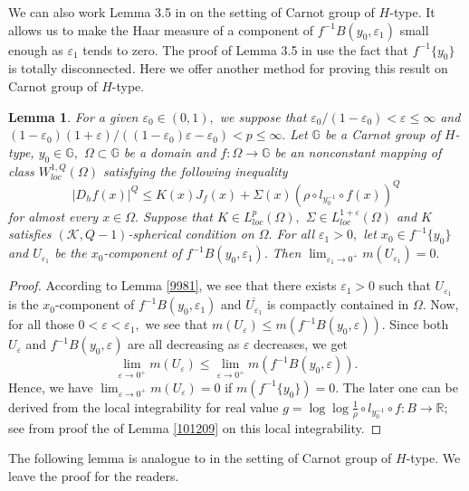 \documentclass[11pt,twoside]{article}
\newtheorem{lem}[thm]{Lemma}
\theoremstyle{definition}
\theoremstyle{remark}
\begin{document}
We can also work  Lemma 3.5  in  \cite{KO221}  on the setting of  Carnot group of $H$-type. It allows us to make the Haar measure of a component of $f^{-1}B(y_{0},\varepsilon_{1})$ small enough as $\varepsilon_{1}$ tends to zero. The proof of Lemma 3.5  in  \cite{KO221}  use the fact that  $f^{-1}\{y_{0}\}$ is totally disconnected. Here we offer another method for proving this result on Carnot group of $H$-type.
\begin{lem}
 For a given $\varepsilon_{0}\in(0,1),$ we suppose that $\varepsilon_{0}/(1-\varepsilon_{0})<\varepsilon\leq\infty$ and $(1-\varepsilon_{0})(1+\varepsilon)/((1-\varepsilon_{0})\varepsilon-\varepsilon_{0})<p\leq\infty.$ Let $\mathbb{G}$ be a Carnot group of $H$-type,  $y_{0}\in\mathbb{G},$ $\Omega\subset\mathbb{G}$ be a domain and $f:\Omega\rightarrow \mathbb{G}$ be an nonconstant mapping of class $W_{loc}^{1,Q}(\Omega)$ satisfying  the following inequality
$$\vert D_{h}f(x)\vert^{Q}\leq K(x)J_{f}(x)+\Sigma(x)(\rho\circ l_{y_{0}^{-1}}\circ f(x))^{Q}$$
for almost every $x\in\Omega.$ Suppose that $K\in L_{loc}^{p}(\Omega),$  $\Sigma\in L_{loc}^{1+\varepsilon}(\Omega)$  and $K$ satisfies $(\mathcal{K},Q-1)$-spherical  condition on $\Omega.$ For all $\varepsilon_{1}>0,$ let $x_{0}\in f^{-1}\{y_{0}\}$ and $U_{\varepsilon_{1}}$ be the $x_{0}$-component of $f^{-1}B(y_{0},\varepsilon_{1}).$ Then
$\lim_{\varepsilon_{1}\rightarrow0^{+}}m(U_{\varepsilon_{1}})=0.$
\end{lem}
\begin{proof}
According to Lemma \ref{9981}, we see that there exists $\varepsilon_{1}>0$ such that  $U_{\varepsilon_{1}}$ is the $x_{0}$-component of $f^{-1}B(y_{0},\varepsilon_{1})$ and $\overline{U_{\varepsilon_{1}}}$ is compactly contained in $\Omega.$ Now, for all those $0<\varepsilon<\varepsilon_{1},$ we see that $m(U_{\varepsilon})\leq m(f^{-1}B(y_{0},\varepsilon)).$ Since both $U_{\varepsilon}$ and $f^{-1}B(y_{0},\varepsilon)$ are all decreasing as $\varepsilon$ decreases, we get 
$$\lim_{\varepsilon\rightarrow0^{+}}m(U_{\varepsilon})\leq \lim_{\varepsilon\rightarrow0^{+}}m(f^{-1}B(y_{0},\varepsilon)).$$
Hence, we have $\lim_{\varepsilon\rightarrow0^{+}}m(U_{\varepsilon})=0$ if $m(f^{-1}\{y_{0}\})=0.$ The later one can be derived from the local integrability for real value $g=\log\log\frac{1}{\rho}\circ l_{y_{0}^{-1}}\circ f: B\rightarrow \mathbb{R};$ see from proof the of Lemma \ref{101209} on this local integrability.
\end{proof}
The following lemma is analogue to \cite[Lemma 4.1]{KO221} in the setting of Carnot group of $H$-type. We leave the proof for the readers.
\end{document}
